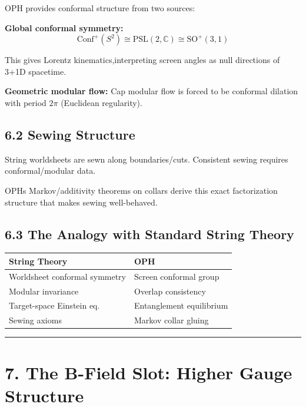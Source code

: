 OPH provides conformal structure from two sources:

\textbf{Global conformal symmetry:} \[\text{Conf}^+(S^2) \cong \text{PSL}(2,\mathbb{C}) \cong \text{SO}^+(3,1)\]

This gives Lorentz kinematics,interpreting screen angles as null directions of 3+1D spacetime.

\textbf{Geometric modular flow:} Cap modular flow is forced to be conformal dilation with period \(2\pi\) (Euclidean regularity).

\subsection{6.2 Sewing Structure}\label{62-sewing-structure}

String worldsheets are sewn along boundaries/cuts. Consistent sewing requires conformal/modular data.

OPH\textquotesingle s Markov/additivity theorems on collars derive this exact factorization structure that makes sewing well-behaved.

\subsection{6.3 The Analogy with Standard String Theory}\label{63-the-analogy-with-standard-string-theory}

{\def\LTcaptype{none} %
\begin{longtable}[]{@{}ll@{}}
\toprule\noalign{}
String Theory & OPH \\
\midrule\noalign{}
\endhead
\bottomrule\noalign{}
\endlastfoot
Worldsheet conformal symmetry & Screen conformal group \\
Modular invariance & Overlap consistency \\
Target-space Einstein eq. & Entanglement equilibrium \\
Sewing axioms & Markov collar gluing \\
\end{longtable}
}

\begin{center}\rule{0.5\linewidth}{0.5pt}\end{center}

\section{7. The B-Field Slot: Higher Gauge Structure}\label{7-the-b-field-slot-higher-gauge-structure}

